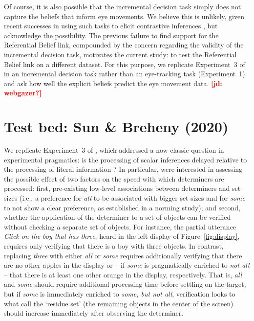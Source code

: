 \documentclass[10pt,letterpaper]{article}
\newcommand{\figref}[1]{Figure~\ref{#1}}
\newcommand{\expref}[1]{Experiment~#1}
\newcommand{\jd}[1]{\textcolor{Red}{\textbf{[jd: #1]}}}
\begin{document}
Of course, it is also possible that the incremental decision task simply does not capture the beliefs that inform eye movements. We believe this is unlikely, given recent successes in using such tasks to elicit contrastive inferences \cite{KreissDegen2020, alsop2018}, but acknowledge the possibility. The previous failure to find support for the Referential Belief link, compounded by the concern regarding the validity of the incremental decision task, motivates the current study: to test the Referential Belief link on a different dataset. For this purpose, we replicate \expref{3} of  in an incremental decision task rather than an eye-tracking task (\expref{1}) and ask how well the explicit beliefs predict the eye movement data. \jd{webgazer?}


\section{Test bed: Sun \& Breheny (2020)}

We replicate \expref{3} of , which addressed a now classic question in experimental pragmatics: is the processing of scalar inferences delayed relative to the processing of literal information \cite{bott2004, Breheny2006, huang2009, grodner2010, DegenTanenhaus2015, DegenT2016, Tomlinson2013}? In particular,   were interested in assessing the possible effect of two factors on the speed with which determiners are processed: first, pre-existing low-level associations between determiners and set sizes (i.e., a preference for \emph{all} to be associated with bigger set sizes and for \emph{some} to not show a clear preference, as established in a norming study); and second, whether the application of the determiner to a set of objects can be verified without checking a separate set of objects. For instance, the partial utterance \emph{Click on the boy that has three}, heard in the left display of \figref{fig:display}, requires only verifying that there is a boy with three objects. In contrast, replacing \emph{three} with either \emph{all} or \emph{some} requires additionally verifying that there are no other apples in the display or -- if \emph{some} is pragmatically enriched to \emph{not all} --  that there is at least one other orange in the display, respectively. That is, \emph{all} and \emph{some} should require additional processing time before settling on the target, but if \emph{some} is immediately enriched to \emph{some, but not all}, verification looks to what  call the `residue set' (the remaining objects in the center of the screen) should increase immediately after observing the determiner. 
\end{document}
